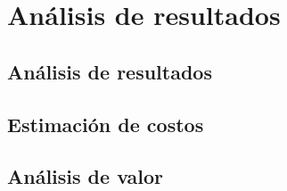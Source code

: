 
\section{Análisis de resultados}

\subsection{Análisis de resultados}

\subsection{Estimación de costos}

\subsection{Análisis de valor}

\newpage

